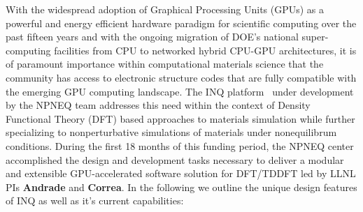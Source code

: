 With the widespread adoption of Graphical Processing Units (GPUs) as a powerful and energy efficient hardware paradigm for scientific computing over the past fifteen years and with the ongoing migration of DOE's national super-computing facilities from CPU to networked hybrid CPU-GPU architectures, it is of paramount importance within computational materials science that the community has access to electronic structure codes that are fully compatible with the emerging GPU computing landscape.
The INQ platform~\cite{Andrade2021} under development by the NPNEQ team addresses this need within the context of Density Functional Theory (DFT) based approaches to materials simulation while further specializing to nonperturbative simulations of materials under nonequilibrum conditions.
During the first 18 months of this funding period, the NPNEQ center accomplished the design and development tasks necessary to deliver a modular and extensible GPU-accelerated software solution for DFT/TDDFT led by LLNL PIs \textbf{Andrade} and \textbf{Correa}.
In the following we outline the unique design features of INQ as well as it's current capabilities:

